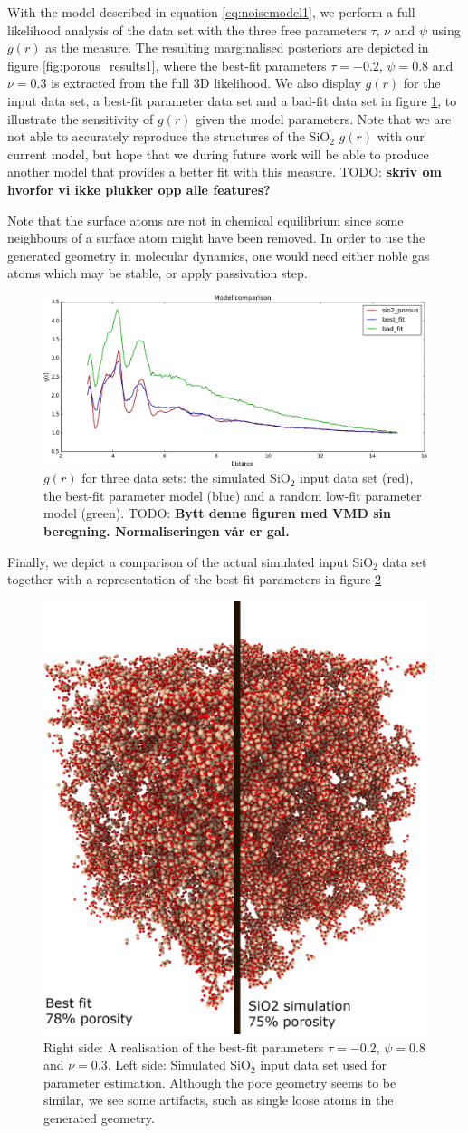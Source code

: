\documentclass[aps,pre,twocolumn,letterpaper,floatfix,showpacs]{revtex4}
\newcommand{\todo}[1]{ {\color{Magenta} TODO: \color{Blue} \textbf{#1} }}
\begin{document}
With the model described in equation \ref{eq:noisemodel1}, we perform a full likelihood analysis of the data set with the three free parameters $\tau$, $\nu$ and $\psi$ using $g(r)$ as the measure. The resulting marginalised posteriors are depicted in figure \ref{fig:porous_results1}, where the best-fit parameters $\tau=-0.2$, $\psi=0.8$ and $\nu=0.3$ is extracted from the full 3D likelihood. We also display $g(r)$ for the input data set, a best-fit parameter data set and a bad-fit data set in figure \ref{fig:gofr1}, to illustrate the sensitivity of $g(r)$ given the model parameters. Note that we are not able to accurately reproduce the structures of the SiO$_2$ $g(r)$ with our current model, but hope that we during future work will be able to produce another model that provides a better fit with this measure. \todo{skriv om hvorfor vi ikke plukker opp alle features?}

Note that the surface atoms are not in chemical equilibrium since some neighbours of a surface atom might have been removed. In order to use the generated geometry in molecular dynamics, one would need either noble gas atoms which may be stable, or apply passivation step.

\begin{figure}
\includegraphics[width=.45\textwidth]{gofr_plot.png}
\caption{$g(r)$ for three data sets: the simulated SiO$_2$ input data set (red), the best-fit parameter model (blue) and a random low-fit parameter model (green). \todo{Bytt denne figuren med VMD sin beregning. Normaliseringen vår er gal.}}
\label{fig:gofr1}
\end{figure}
Finally, we depict a comparison of the actual simulated input SiO$_2$ data set together with a representation of the best-fit parameters in figure \ref{fig:porous_vs_model}   
\begin{figure}
\includegraphics[width=.45\textwidth]{comparison.png}
\caption{Right side: A realisation of the best-fit parameters $\tau=-0.2$, $\psi=0.8$ and $\nu=0.3$. Left side: Simulated SiO$_2$ input data set used for parameter estimation. Although the pore geometry seems to be similar, we see some artifacts, such as single loose atoms in the generated geometry.}
\label{fig:porous_vs_model}
\end{figure}
\end{document}
